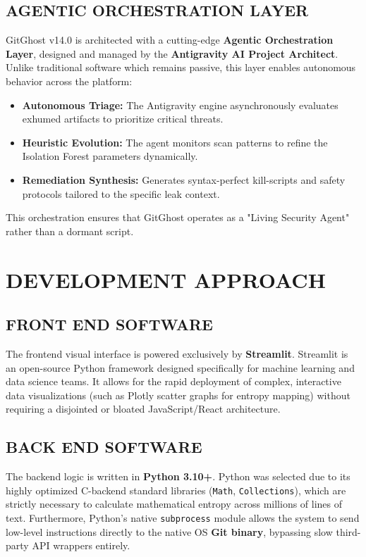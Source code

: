 \documentclass[12pt, a4paper, oneside]{report}
\begin{document}
\section{AGENTIC ORCHESTRATION LAYER}
GitGhost v14.0 is architected with a cutting-edge \textbf{Agentic Orchestration Layer}, designed and managed by the \textbf{Antigravity AI Project Architect}. Unlike traditional software which remains passive, this layer enables autonomous behavior across the platform:

\begin{itemize}
    \item \textbf{Autonomous Triage:} The Antigravity engine asynchronously evaluates exhumed artifacts to prioritize critical threats.
    \item \textbf{Heuristic Evolution:} The agent monitors scan patterns to refine the Isolation Forest parameters dynamically.
    \item \textbf{Remediation Synthesis:} Generates syntax-perfect kill-scripts and safety protocols tailored to the specific leak context.
\end{itemize}

This orchestration ensures that GitGhost operates as a "Living Security Agent" rather than a dormant script.

\chapter{DEVELOPMENT APPROACH}

\section{FRONT END SOFTWARE}
The frontend visual interface is powered exclusively by \textbf{Streamlit}. Streamlit is an open-source Python framework designed specifically for machine learning and data science teams. It allows for the rapid deployment of complex, interactive data visualizations (such as Plotly scatter graphs for entropy mapping) without requiring a disjointed or bloated JavaScript/React architecture.

\section{BACK END SOFTWARE}
The backend logic is written in \textbf{Python 3.10+}. Python was selected due to its highly optimized C-backend standard libraries (\texttt{Math}, \texttt{Collections}), which are strictly necessary to calculate mathematical entropy across millions of lines of text. Furthermore, Python's native \texttt{subprocess} module allows the system to send low-level instructions directly to the native OS \textbf{Git binary}, bypassing slow third-party API wrappers entirely.
\end{document}
